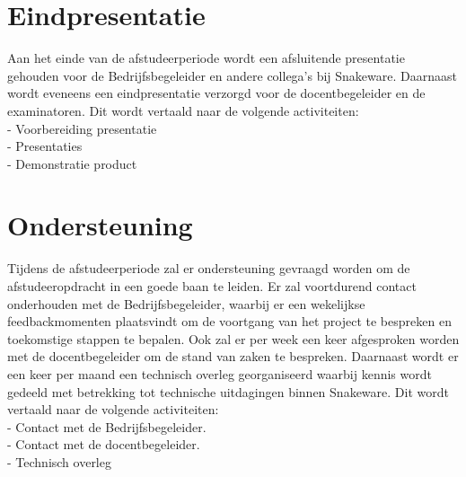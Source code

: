 \section{Eindpresentatie}
Aan het einde van de afstudeerperiode wordt een afsluitende presentatie gehouden voor de Bedrijfsbegeleider en andere collega's bij Snakeware.
Daarnaast wordt eveneens een eindpresentatie verzorgd voor de docentbegeleider en de examinatoren.
Dit wordt vertaald naar de volgende activiteiten: \\
- Voorbereiding presentatie \\
- Presentaties \\
- Demonstratie product
\section{Ondersteuning}
Tijdens de afstudeerperiode zal er ondersteuning gevraagd worden om de afstudeeropdracht in een goede baan te leiden. 
Er zal voortdurend contact onderhouden met de Bedrijfsbegeleider, waarbij er een wekelijkse feedbackmomenten plaatsvindt om de voortgang van het project te bespreken en toekomstige stappen te bepalen.
Ook zal er per week een keer afgesproken worden met de docentbegeleider om de stand van zaken te bespreken.
Daarnaast wordt er een keer per maand een technisch overleg georganiseerd waarbij kennis wordt gedeeld met betrekking tot technische uitdagingen binnen Snakeware.
Dit wordt vertaald naar de volgende activiteiten: \\
- Contact met de Bedrijfsbegeleider. \\
- Contact met de docentbegeleider. \\
- Technisch overleg
